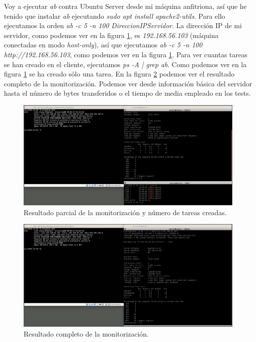 \documentclass[a4paper,titlepage,12pt]{scrartcl}	%
\numberwithin{figure}{section} %
\numberwithin{table}{section} %
\begin{document}
	Voy a ejecutar \textit{ab} contra Ubuntu Server desde mi máquina anfitriona, así que he tenido que instalar \textit{ab} ejecutando \textit{sudo apt install apache2-utils}. Para ello ejecutamos la orden \textit{ab -c 5 -n 100 DireccionIPServidor}. La dirección IP de mi servidor, como podemos ver en la figura \ref{2-1}, es \textit{192.168.56.103} (máquina conectadas en modo \textit{host-only}), así que ejecutamos \textit{ab -c 5 -n 100 http://192.168.56.103}, como podemos ver en la figura \ref{2-1}. Para ver cuantas tareas se han creado en el cliente, ejecutamos \textit{ps -A | grep ab}. Como podemos ver en la figura \ref{2-1} se ha creado sólo una tarea. En la figura \ref{2-2} podemos ver el resultado completo de la monitorización. Podemos ver desde información básica del servidor hasta el número de bytes transferidos o el tiempo de media empleado en los tests.
	
	\begin{figure}[H]
		\includegraphics[width=\linewidth]{./Imagenes/2-1.png}
		\vspace{-0.5cm}
		\caption[Resultado parcial de la monitorización y número de tareas creadas.]{Resultado parcial de la monitorización y número de tareas creadas.}
		\label{2-1}
	\end{figure}
		
	\begin{figure}[H]
		\includegraphics[width=\linewidth]{./Imagenes/2-2.png}
		\vspace{-0.5cm}
		\caption[Resultado completo de la monitorización.]{Resultado completo de la monitorización.}
		\label{2-2}
	\end{figure}
	
\end{document}
